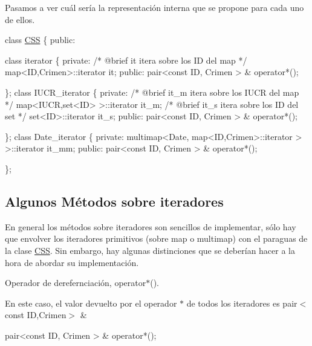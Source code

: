Pasamos a ver cuál sería la representación interna que se propone para cada uno de ellos. 
\begin{DoxyCode}
\textcolor{keyword}{class }\hyperlink{classCSS}{CSS} \{
\textcolor{keyword}{public}:


    \textcolor{keyword}{class }iterator \{
    \textcolor{keyword}{private}:
        \textcolor{comment}{/* @brief it  itera sobre los ID del map }
\textcolor{comment}{      */}
        map<ID,Crimen>::iterator it;
    \textcolor{keyword}{public}:
           pair<const ID, Crimen > & operator*();   
    
    \};
    \textcolor{keyword}{class }IUCR\_iterator \{
    \textcolor{keyword}{private}:
      \textcolor{comment}{/* @brief it\_m itera sobre los IUCR del map }
\textcolor{comment}{      */}
      map<IUCR,set<ID> >::iterator it\_m; 
    \textcolor{comment}{/* @brief it\_s itera sobre los ID del set }
\textcolor{comment}{      */}
      set<ID>::iterator it\_s;
    \textcolor{keyword}{public}: 
        pair<const ID, Crimen > & operator*();

     \};
    \textcolor{keyword}{class }Date\_iterator \{
\textcolor{keyword}{private}:
         multimap<Date, map<ID,Crimen>::iterator > >::iterator it\_mm;
      \textcolor{keyword}{public}:
        pair<const ID, Crimen > & operator*();
    
     \};
\end{DoxyCode}
\hypertarget{index_métodosIt}{}\subsection{Algunos Métodos sobre iteradores}\label{index_métodosIt}
En general los métodos sobre iteradores son sencillos de implementar, sólo hay que envolver los iteradores primitivos (sobre map o multimap) con el paraguas de la clase \hyperlink{classCSS}{C\+S\+S}. Sin embargo, hay algunas distinciones que se deberían hacer a la hora de abordar su implementación.

\begin{DoxyItemize}
\item Operador de derefernciación, operator$\ast$().\end{DoxyItemize}
En este caso, el valor devuelto por el operador $\ast$ de todos los iteradores es pair$<$const I\+D,\+Crimen$>$ \&


\begin{DoxyCode}
pair<const ID, Crimen > &  operator*();   
\end{DoxyCode}


